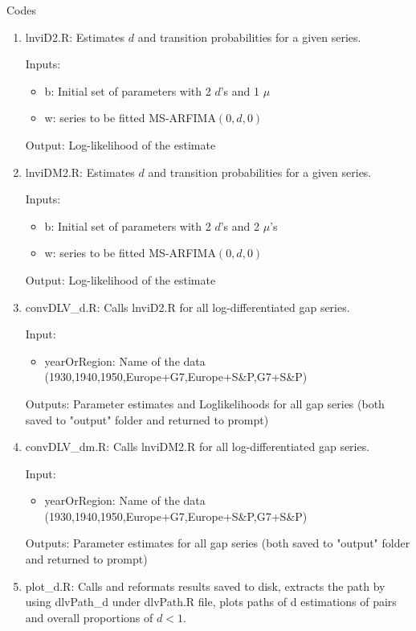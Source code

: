\documentclass{article}
\begin{document}
\begin{flushleft}
	\large Codes
\end{flushleft}
\begin{enumerate}
	\item lnviD2.R: Estimates $ d $ and transition probabilities for a given series.

	Inputs:
		 \begin{itemize}
		 	\item b: Initial set of parameters with 2 $ d $'s and 1 $ \mu $
		 	\item w: series to be fitted MS-ARFIMA$ (0,d,0) $
		 \end{itemize}
		 
	Output: Log-likelihood of the estimate
	
	\item lnviDM2.R: Estimates $ d $ and transition probabilities for a given series.

Inputs:
\begin{itemize}
	\item b: Initial set of parameters with 2 $ d $'s and 2 $ \mu $'s
	\item w: series to be fitted MS-ARFIMA$ (0,d,0) $
\end{itemize}

Output: Log-likelihood of the estimate
	\item convDLV\_d.R: Calls lnviD2.R for all log-differentiated gap series.
	
		Input:
		\begin{itemize}
			
			\item yearOrRegion: Name of the data (1930,1940,1950,Europe+G7,Europe+S\&P,G7+S\&P)

		\end{itemize}
		
		Outputs: Parameter estimates and Loglikelihoods for all gap series (both saved to "output" folder and returned to prompt)
		

\item convDLV\_dm.R: Calls lnviDM2.R for all log-differentiated gap series.

Input:
\begin{itemize}
	
	\item yearOrRegion: Name of the data (1930,1940,1950,Europe+G7,Europe+S\&P,G7+S\&P)
	
\end{itemize}

Outputs: Parameter estimates for all gap series (both saved to "output" folder and returned to prompt)
	\item plot\_d.R: Calls and reformats results saved to disk, extracts the path by using dlvPath\_d under dlvPath.R file, plots paths of d estimations of pairs and overall proportions of $ d < 1 $.
	

\end{enumerate}
\end{document}
